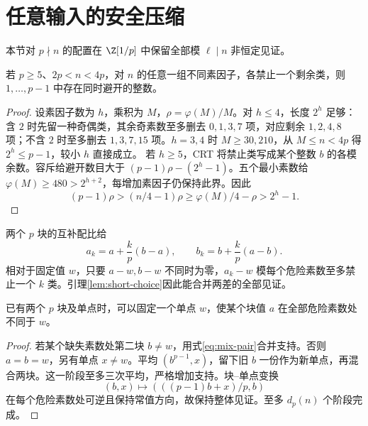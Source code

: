 \section{任意输入的安全压缩}\label{sec:compression}
本节对 $p\nmid n$ 的配置在 $\Z[1/p]$ 中保留全部模 $\ell\mid n$ 非恒定见证。

\begin{lemma}\label{lem:short-choice}
若 $p\ge5$、$2p<n<4p$，对 $n$ 的任意一组不同素因子，各禁止一个剩余类，则 $1,\ldots,p-1$ 中存在同时避开的整数。
\end{lemma}
\begin{proof}
设素因子数为 $h$，乘积为 $M$，$\rho=\varphi(M)/M$。对 $h\le4$，长度 $2^h$ 足够：含 $2$ 时先留一种奇偶类，其余奇素数至多删去 $0,1,3,7$ 项，对应剩余 $1,2,4,8$ 项；不含 $2$ 时至多删去 $1,3,7,15$ 项。$h=3,4$ 时 $M\ge30,210$，从 $M\le n<4p$ 得 $2^h\le p-1$，较小 $h$ 直接成立。
若 $h\ge5$，CRT 将禁止类写成某个整数 $b$ 的各模余数。容斥给避开数目大于 $(p-1)\rho-(2^h-1)$。五个最小素数给 $\varphi(M)\ge480>2^{h+2}$，每增加素因子仍保持此界。因此
\[(p-1)\rho>(n/4-1)\rho\ge\varphi(M)/4-\rho>2^h-1.
\]
\end{proof}

两个 $p$ 块的互补配比给
\begin{equation}\label{eq:mix-pair}
a_k=a+\frac{k}{p}(b-a),\qquad b_k=b+\frac{k}{p}(a-b).
\end{equation}
相对于固定值 $w$，只要 $a-w,b-w$ 不同时为零，$a_k-w$ 模每个危险素数至多禁止一个 $k$ 类。引理\ref{lem:short-choice}因此能合并两差的全部见证。

\begin{lemma}\label{lem:concentrate}
已有两个 $p$ 块及单点时，可以固定一个单点 $w$，使某个块值 $a$ 在全部危险素数处不同于 $w$。
\end{lemma}
\begin{proof}
若某个缺失素数处第二块 $b\ne w$，用式\eqref{eq:mix-pair}合并支持。否则 $a=b=w$，另有单点 $x\ne w$。平均 $(b^{p-1},x)$，留下旧 $b$ 一份作为新单点，再混合两块。这一阶段至多三次平均，严格增加支持。块--单点变换
\begin{equation}\label{eq:exchange}
(b,x)\longmapsto(((p-1)b+x)/p,b)
\end{equation}
在每个危险素数处可逆且保持常值方向，故保持整体见证。至多 $d_p(n)$ 个阶段完成。
\end{proof}

